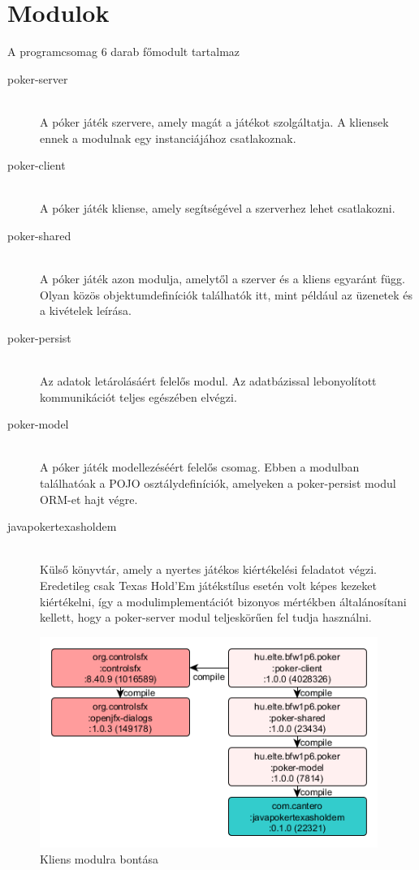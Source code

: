 \section{Modulok}
A programcsomag 6 darab főmodult tartalmaz
\begin{description}
  \item[poker-server] \hfill \\
  A póker játék szervere, amely magát a játékot szolgáltatja. A kliensek ennek a modulnak egy instanciájához csatlakoznak.
  \item[poker-client] \hfill \\
  A póker játék kliense, amely segítségével a szerverhez lehet csatlakozni.
  \item[poker-shared] \hfill \\
   A póker játék azon modulja, amelytől a szerver és a kliens egyaránt függ. Olyan közös objektumdefiníciók találhatók itt, mint például az üzenetek és a kivételek leírása.
   \item[poker-persist] \hfill \\
   Az adatok letárolásáért felelős modul. Az adatbázissal lebonyolított kommunikációt teljes egészében elvégzi.
   \item[poker-model] \hfill \\
   A póker játék modellezéséért felelős csomag. Ebben a modulban találhatóak a POJO \cite{pojo} osztálydefiníciók, amelyeken a poker-persist modul ORM-et \cite{orm} hajt végre.
   \item[javapokertexasholdem] \hfill \\
   Külső könyvtár, amely a nyertes játékos kiértékelési feladatot végzi. Eredetileg csak Texas Hold'Em játékstílus esetén volt képes kezeket kiértékelni, így a modulimplementációt bizonyos mértékben általánosítani kellett, hogy a poker-server modul teljeskörűen fel tudja használni.
\end{description}
\begin{figure}[h!]
	\caption{Kliens modulra bontása}
	\label{fig:client_modul}
	\centering
	\includegraphics[width=11cm]{developer-documentation/images/poker-client-deps.png}
\end{figure}
